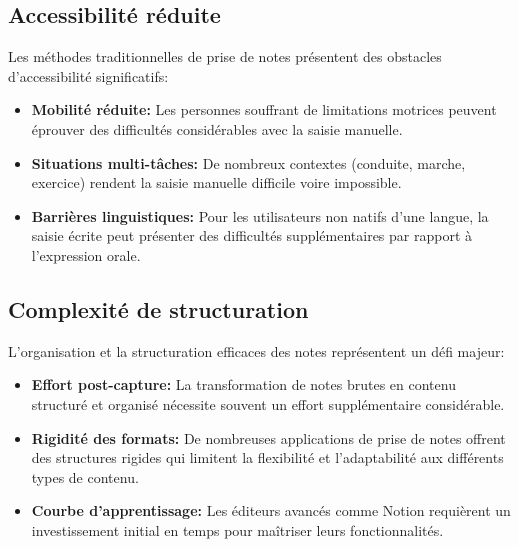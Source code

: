 \subsection{Accessibilité réduite}

Les méthodes traditionnelles de prise de notes présentent des obstacles d'accessibilité significatifs:

\begin{itemize}
    \item \textbf{Mobilité réduite:} Les personnes souffrant de limitations motrices peuvent éprouver des difficultés considérables avec la saisie manuelle.
    
    \item \textbf{Situations multi-tâches:} De nombreux contextes (conduite, marche, exercice) rendent la saisie manuelle difficile voire impossible.
    
    \item \textbf{Barrières linguistiques:} Pour les utilisateurs non natifs d'une langue, la saisie écrite peut présenter des difficultés supplémentaires par rapport à l'expression orale.
\end{itemize}

\subsection{Complexité de structuration}

L'organisation et la structuration efficaces des notes représentent un défi majeur:

\begin{itemize}
    \item \textbf{Effort post-capture:} La transformation de notes brutes en contenu structuré et organisé nécessite souvent un effort supplémentaire considérable.
    
    \item \textbf{Rigidité des formats:} De nombreuses applications de prise de notes offrent des structures rigides qui limitent la flexibilité et l'adaptabilité aux différents types de contenu.
    
    \item \textbf{Courbe d'apprentissage:} Les éditeurs avancés comme Notion requièrent un investissement initial en temps pour maîtriser leurs fonctionnalités.
\end{itemize}


